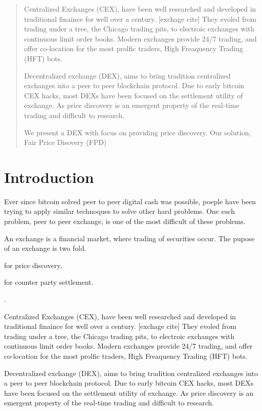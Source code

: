 \documentclass[12pt]{article}
\begin{document}
\begin{abstract}
Centralized Exchanges (CEX), have been well researched and developed in traditional finaince for well over a century. [exchage cite] They  evoled from trading under a tree, the Chicago trading pits, to electroic exchanges with continuous limit order books. Modern exchanges provide 24/7 trading, and offer co-location for the most prolfic traders, High Freaquency Trading (HFT) bots. 

Decentralized exchange (DEX), aims to bring tradition centralized exchanges into a peer to peer blockchain protocol. Due to early bitcoin CEX hacks, most DEXs have been focused on the settlement utility of exchange. As price discovery is an emergent property of the real-time trading and difficult to research. 

We present a DEX with focus on providing price discovery. Our solution, Fair Price Disovery (FPD) 

\end{abstract}

\section{Introduction}
Ever since bitcoin solved peer to peer digital cash was possible, poeple have been trying to apply similar technoques to solve other hard problems. One such problem, peer to peer exchange, is one of the most difficult of these problems. 

An exchange is a financial market, where trading of securities occur. The pupose of an exchange is two fold. \begin {enumerate*} [1) ]%
\item for price discovery, \item for counter party settlement. \end {enumerate*}. 

Centralized Exchanges (CEX), have been well researched and developed in traditional finaince for well over a century. [exchage cite] They  evoled from trading under a tree, the Chicago trading pits, to electroic exchanges with continuous limit order books. Modern exchanges provide 24/7 trading, and offer co-location for the most prolfic traders, High Freaquency Trading (HFT) bots. 

Decentralized exchange (DEX), aims to bring tradition centralized exchanges into a peer to peer blockchain protocol. Due to early bitcoin CEX hacks, most DEXs have been focused on the settlement utility of exchange. As price discovery is an emergent property of the real-time trading and difficult to research. 
\end{document}

